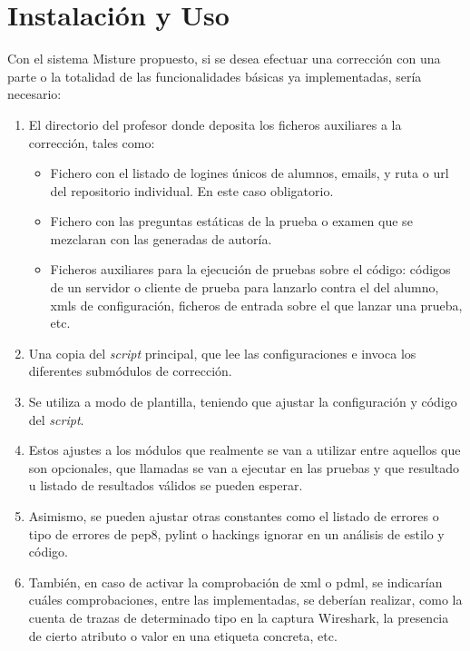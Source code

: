 \cleardoublepage
\appendix
\chapter{Instalación y Uso}
\label{app:instalacion}


Con el sistema Misture propuesto, si se desea efectuar una corrección con una parte o la totalidad de las funcionalidades básicas ya implementadas, sería necesario:\\

\begin{enumerate}
\item El directorio del profesor donde deposita los ficheros auxiliares a la corrección, tales como:\\

\begin{itemize}
\item Fichero con el listado de logines únicos de alumnos, emails, y ruta o url del repositorio individual. En este caso obligatorio.\\

\item Fichero con las preguntas estáticas de la prueba o examen que se mezclaran con las generadas de autoría.\\

\item Ficheros auxiliares para la ejecución de pruebas sobre el código: códigos de un servidor o cliente de prueba para lanzarlo contra el del alumno, xmls de configuración, ficheros de entrada sobre el que lanzar una prueba, etc.\\
\end{itemize}

\item Una copia del \textit{script} principal, que lee las configuraciones e invoca los diferentes submódulos de corrección.\\

\item Se utiliza a modo de plantilla, teniendo que ajustar la configuración y código del \textit{script}.\\

\item Estos ajustes a los módulos que realmente se van a utilizar entre aquellos que son opcionales, que llamadas se van a ejecutar en las pruebas y que resultado u listado de resultados válidos se pueden esperar.\\

\item Asimismo, se pueden ajustar otras constantes como el listado de errores o tipo de errores de pep8, pylint o hackings ignorar en un análisis de estilo y código.\\

\item También, en caso de activar la comprobación de xml o pdml, se indicarían cuáles comprobaciones, entre las implementadas, se deberían realizar, como la cuenta de trazas de determinado tipo en la captura Wireshark, la presencia de cierto atributo o valor en una etiqueta concreta, etc.\\
\end{enumerate}

